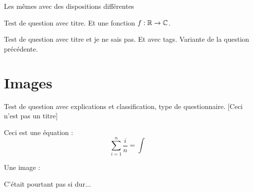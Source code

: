 \documentclass[12pt,a4paper]{article}
\begin{document}
Les mêmes avec des dispositions différentes
\begin{question}
  \qoneline
{}

Test de question avec titre. Et une fonction $f : \mathbb{R} \to \mathbb{C}$.
\begin{answers}


\end{answers}
\end{question}



\begin{question} 
\qkeeporder
\qmulticols
\qidontknow

Test de question avec titre et je ne sais pas. Et avec tags. Variante de la question précédente.

\begin{answers}
\end{answers}
\end{question}

\section{Images}

\begin{question}
\qoneline

Test de question avec explications et classification, type de questionnaire. [Ceci n'est pas un titre]

Ceci est une équation :
$$\sum_{i=1}^n \frac{i}{n}=\int$$

Une image :



\begin{answers}

\end{answers}

\begin{explanations}
C'était pourtant pas si dur...
\end{explanations}

\end{question}
\end{document}
